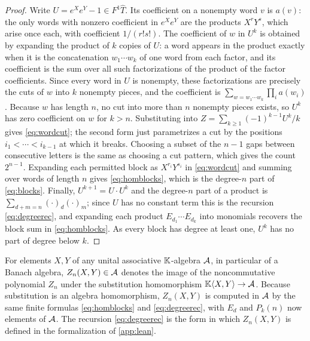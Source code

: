 \begin{proof}
Write $U=e^Xe^Y-1\in F^1\widehat T$. Its coefficient on a nonempty word $v$
is $a(v)$: the only words with nonzero coefficient in $e^Xe^Y$ are the
products $X^rY^s$, which arise once each, with coefficient $1/(r!s!)$. The
coefficient of $w$ in $U^k$ is obtained by expanding the product of $k$
copies of $U$: a word appears in the product exactly when it is the
concatenation $w_1\cdots w_k$ of one word from each factor, and its
coefficient is the sum over all such factorizations of the product of the
factor coefficients. Since every word in $U$ is nonempty, these
factorizations are precisely the cuts of $w$ into $k$ nonempty pieces, and
the coefficient is $\sum_{w=w_1\cdots w_k}\prod_ia(w_i)$. Because $w$ has
length $n$, no cut into more than $n$ nonempty pieces exists, so $U^k$ has
zero coefficient on $w$ for $k>n$. Substituting into
$Z=\sum_{k\geq1}(-1)^{k-1}U^k/k$ gives \eqref{eq:wordcut}; the second form
just parametrizes a cut by the positions $i_1<\cdots<i_{k-1}$ at which it
breaks. Choosing a subset of the $n-1$ gaps between consecutive letters is
the same as choosing a cut pattern, which gives the count $2^{n-1}$.
Expanding each permitted block as $X^{r_i}Y^{s_i}$ in \eqref{eq:wordcut}
and summing over words of length $n$ gives \eqref{eq:homblocks}, which is
the degree-$n$ part of \eqref{eq:blocks}. Finally, $U^{k+1}=U\cdot U^k$ and
the degree-$n$ part of a product is $\sum_{d+m=n}(\cdot)_d(\cdot)_m$; since
$U$ has no constant term this is the recursion \eqref{eq:degreerec}, and
expanding each product $E_{d_1}\cdots E_{d_k}$ into monomials recovers the
block sum in \eqref{eq:homblocks}. As every block has degree at least one,
$U^k$ has no part of degree below $k$.
\end{proof}

\begin{remark}\label{rem:evaluation}
For elements $X,Y$ of any unital associative $\mathbb{K}$-algebra $\mathcal{A}$, in
particular of a Banach algebra, $Z_n(X,Y)\in\mathcal{A}$ denotes the image of the
noncommutative polynomial $Z_n$ under the substitution homomorphism
$\mathbb{K}\langle X,Y\rangle\to\mathcal{A}$. Because substitution is an algebra
homomorphism, $Z_n(X,Y)$ is computed in $\mathcal{A}$ by the same finite formulas
\eqref{eq:homblocks} and \eqref{eq:degreerec}, with $E_d$ and $P_k(n)$ now
elements of $\mathcal{A}$. The recursion \eqref{eq:degreerec} is the form in which
$Z_n(X,Y)$ is defined in the formalization of \cref{app:lean}.
\end{remark}

